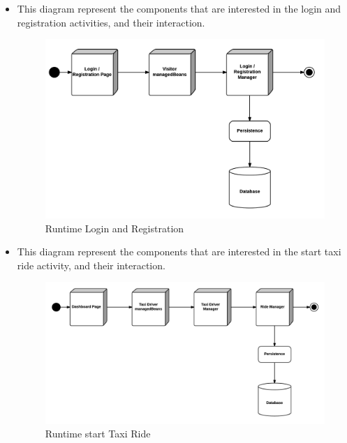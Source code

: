 \begin{itemize}
	\item This diagram represent the components that are interested in the login and registration activities, and their interaction.
	\begin{figure}[htbp]
	\centering
	\includegraphics[width=\textwidth]{cpt/img/RuntimeLoginRegisterView}
	\caption{Runtime Login and Registration}
	\end{figure}
	\clearpage
	
	\item This diagram represent the components that are interested in the start taxi ride activity, and their interaction.
	\begin{figure}[htbp]
	\centering
	\includegraphics[width=\textwidth]{cpt/img/RuntimeStartTaxiRideView}
	\caption{Runtime start Taxi Ride}
	\end{figure}
	\clearpage
	

\end{itemize}
